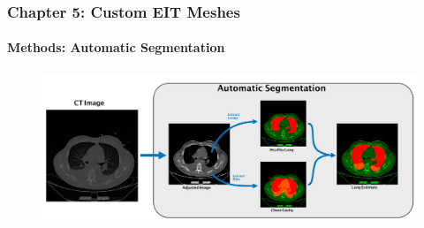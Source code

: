 \documentclass[10pt,    %
    english,            %
    xcolor=table,       %
    envcountsect,        %
    aspectratio=1610
]{beamer}
\begin{document}
% 
 
\begin{frame}
	\frametitle{Chapter 5: Custom EIT Meshes}
	\framesubtitle{Methods: Automatic Segmentation}    
		\begin{figure}[H]
			\centering
			\includegraphics[width=\textwidth]{lung_segmentation_methods_a.pdf}
		\end{figure}
\end{frame}

\end{document}
